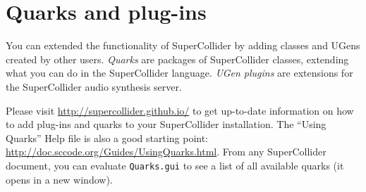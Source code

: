 \section{Quarks and plug-ins}

You can extended the functionality of SuperCollider by adding classes and UGens created by other users. \emph{Quarks} are packages of SuperCollider classes, extending what you can do in the SuperCollider language. \emph{UGen plugins} are extensions for the SuperCollider audio synthesis server.

Please visit \url{http://supercollider.github.io/} to get up-to-date information on how to add plug-ins and quarks to your SuperCollider installation. The ``Using Quarks'' Help file is also a good starting point: \url{http://doc.sccode.org/Guides/UsingQuarks.html}. From any SuperCollider document, you can evaluate \texttt{Quarks.gui} to see a list of all available quarks (it opens in a new window).
